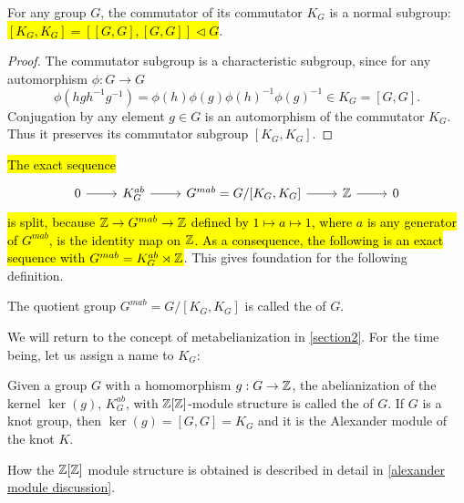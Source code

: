 \begin{lemma}
  For any group $G$, the commutator of its commutator $K_G$ is a normal subgroup: \hl{$[K_G, K_G]=[[G, G], [G, G]]\triangleleft G$}. 
\end{lemma}

\begin{proof}
  The commutator subgroup is a characteristic subgroup, since for any automorphism $\phi:G\to G$ 
  $$\phi(hgh^{-1}g^{-1})=\phi(h)\phi(g)\phi(h)^{-1}\phi(g)^{-1}\in K_G=[G, G].$$
  Conjugation by any element $g\in G$ is an automorphism of the commutator $K_G$. Thus it preserves its commutator subgroup $[K_G, K_G]$. 
\end{proof}

\hl{The exact sequence}
\begin{equation}\label{split sequence metab}
  \begin{tikzcd}
    0\arrow[r] & K_G^{ab} \arrow[r] & G^{mab}=G/[K_G, K_G]\arrow[r] & \Z \arrow[r] & 0
  \end{tikzcd}
\end{equation}
\hl{is split, because $\operatorname{\mathbb{Z}}\to G^{mab}\to\operatorname{\mathbb{Z}}$ defined by $1\mapsto a\mapsto 1$, where $a$ is any generator of $G^{mab}$, is the identity map on $\operatorname{\mathbb{Z}}$. As a consequence, the following is an exact sequence with $G^{mab}=K^{ab}_G \rtimes \operatorname{\mathbb{Z}}$}. This gives foundation for the following definition.


\begin{definition}[metabelianization]\label{metab def}
  The quotient group $G^{mab}=G/[K_G, K_G]$ is called the  of $G$. 
\end{definition}

We will return to the concept of metabelianization in \cref{section2}. For the time being, let us assign a name to $K_G$:

\begin{definition}\label{alexander module def}
  Given a group $G$ with a homomorphism $g:G\to \operatorname{\mathbb{Z}}$, the abelianization of the kernel $\ker(g)$, $K_G^{ab}$, with $\operatorname{\mathbb{Z}}[\operatorname{\mathbb{Z}}]$-module structure is called the  of $G$. If $G$ is a knot group, then $\ker(g)=[G, G]=K_G$ and it is the Alexander module of the knot $K$.
\end{definition}

How the $\operatorname{\mathbb{Z}}[\operatorname{\mathbb{Z}}]$ module structure is obtained is described in detail in \cref{alexander module discussion}.




